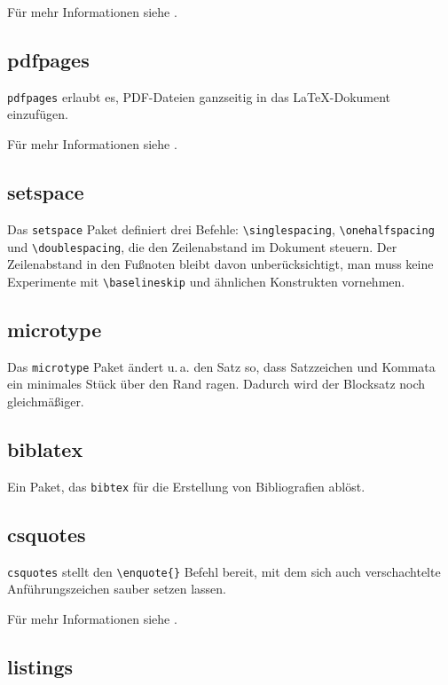 Für mehr Informationen siehe \cite{longtable}.


\subsection{pdfpages}

\texttt{pdfpages} erlaubt es, PDF-Dateien ganzseitig in das \LaTeX-Dokument einzufügen. 

Für mehr Informationen siehe \cite{pdfpages}.


\subsection{setspace}

Das \texttt{setspace} Paket definiert drei Befehle: \verb|\singlespacing|, \verb|\onehalfspacing| und \verb|\doublespacing|, die den Zeilenabstand im Dokument steuern. Der Zeilenabstand in den Fußnoten bleibt davon unberücksichtigt, man muss keine Experimente mit \verb|\baselineskip| und ähnlichen Konstrukten vornehmen.

\subsection{microtype}

Das \texttt{microtype} Paket ändert u.\,a. den Satz so, dass Satzzeichen und Kommata ein minimales Stück über den Rand ragen. Dadurch wird der Blocksatz noch gleichmäßiger.

\subsection{biblatex}

Ein Paket, das \texttt{bibtex} für die Erstellung von Bibliografien ablöst.

\subsection{csquotes}

\texttt{csquotes} stellt den \verb|\enquote{}| Befehl bereit, mit dem sich auch verschachtelte Anführungszeichen sauber setzen lassen. 

Für mehr Informationen siehe \cite{csquotes}.


\subsection{listings}


